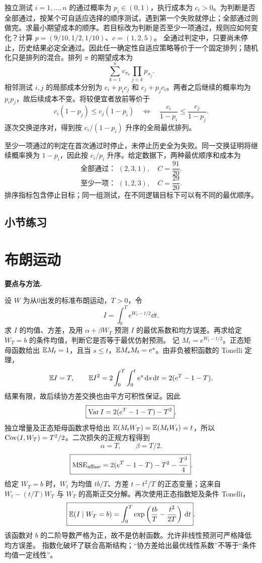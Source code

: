 独立测试 $i=1,\ldots,n$ 的通过概率为 $p_i\in(0,1)$，执行成本为 $c_i>0$。为判断是否全部通过，按某个可自适应选择的顺序测试，遇到第一个失败就停止；全部通过则做完。求最小期望成本的顺序。若目标改为判断是否至少一项通过，规则应如何变化？计算 $p=(9/10,1/2,1/10)$、$c=(1,2,5)$。
\solution 全通过判定中，只要尚未停止，历史结果必定全通过。因此任一确定性自适应策略等价于一个固定排列；随机化只是排列的混合。排列 $\pi$ 的期望成本为
\[
 \sum_{k=1}^n c_{\pi_k}\prod_{j<k}p_{\pi_j}.
\]
相邻测试 $i,j$ 的局部成本分别为 $c_i+p_ic_j$ 和 $c_j+p_jc_i$。两者之后继续的概率均为 $p_ip_j$，故后续成本不变。将较便宜者放前等价于
\[
 c_i(1-p_j)\le c_j(1-p_i)
 \quad\Longleftrightarrow\quad
 \frac{c_i}{1-p_i}\le\frac{c_j}{1-p_j}.
\]
逐次交换逆序对，得到按 $c_i/(1-p_i)$ 升序的全局最优排列。

至少一项通过的判定在首次通过时停止，未停止历史全为失败。同一交换证明将继续概率换为 $1-p_i$，因此按 $c_i/p_i$ 升序。给定数据下，两种最优顺序和成本为
\[
 \boxed{\text{全部通过： }(2,3,1),\quad C=\frac{91}{20}}.
\]
\[
 \boxed{\text{至少一项： }(1,2,3),\quad C=\frac{29}{20}}.
\]
\insight 排序指标包含停止目标；同一组测试，在不同逻辑目标下可以有不同的最优顺序。

\par{}
\subsection*{小节练习}



\section{布朗运动}
\noindent\textbf{要点与方法.}\enspace



设 $W$ 为从0出发的标准布朗运动，$T>0$，令
\[
 I=\int_0^T e^{W_t-t/2}\dd t.
\]
求 $I$ 的均值、方差，及用 $\alpha+\beta W_T$ 预测 $I$ 的最优系数和均方误差。再求给定 $W_T=b$ 的条件均值，判断它是否等于最优仿射预测。
\solution 记 $M_t=e^{W_t-t/2}$。正态矩母函数给出 $\mathbb{E} M_t=1$，且当 $s\le t$，$\mathbb{E} M_sM_t=e^s$。由非负被积函数的 Tonelli 定理，
\[
 \mathbb{E} I=T,\qquad
 \mathbb{E} I^2=2\int_0^T\int_0^t e^s\,\mathrm{d} s\,\mathrm{d} t
 =2(e^T-1-T).
\]
结果有限，故后续协方差交换也由平方可积性保证。因此
\[
 \boxed{\operatorname{Var} I=2(e^T-1-T)-T^2}.
\]
独立增量及正态矩母函数求导给出 $\mathbb{E}(M_tW_T)=\mathbb{E}(M_tW_t)=t$，所以 $\operatorname{Cov}(I,W_T)=T^2/2$。二次损失的正规方程得到
\[
 \boxed{\alpha=T,\qquad\beta=T/2}.
\]
\[
 \boxed{\operatorname{MSE}_{\rm affine}=2(e^T-1-T)-T^2-\frac{T^3}{4}}.
\]
给定 $W_T=b$ 时，$W_t$ 为均值 $tb/T$、方差 $t-t^2/T$ 的正态变量；这来自 $W_t-(t/T)W_T$ 与 $W_T$ 的高斯正交分解。再次使用正态指数矩及条件 Tonelli，
\[
 \boxed{\mathbb{E}(I\mid W_T=b)=\int_0^T
 \exp\left(\frac{tb}{T}-\frac{t^2}{2T}\right)\,\mathrm{d} t}.
\]
该函数对 $b$ 的二阶导数严格为正，故不是仿射函数。允许非线性预测可严格降低均方误差。
\insight 指数化破坏了联合高斯结构；“协方差给出最优线性系数”不等于“条件均值一定线性”。

